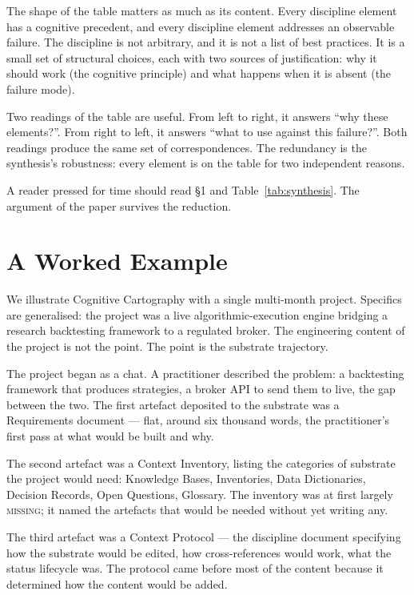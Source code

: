 \documentclass[11pt,a4paper,twocolumn]{article}
\begin{document}
The shape of the table matters as much as its content. Every
discipline element has a cognitive precedent, and every discipline
element addresses an observable failure. The discipline is not
arbitrary, and it is not a list of best practices. It is a small
set of structural choices, each with two sources of justification:
why it should work (the cognitive principle) and what happens when
it is absent (the failure mode).

Two readings of the table are useful. From left to right, it
answers ``why these elements?''. From right to left, it answers
``what to use against this failure?''. Both readings produce the
same set of correspondences. The redundancy is the synthesis's
robustness: every element is on the table for two independent
reasons.

A reader pressed for time should read \S1 and
Table~\ref{tab:synthesis}. The argument of the paper survives the
reduction.

\section{A Worked Example}
\label{sec:example}

We illustrate Cognitive Cartography with a single multi-month
project. Specifics are generalised: the project was a live
algorithmic-execution engine bridging a research backtesting
framework to a regulated broker. The engineering content of the
project is not the point. The point is the substrate trajectory.

The project began as a chat. A practitioner described the
problem: a backtesting framework that produces strategies, a broker
API to send them to live, the gap between the two. The first
artefact deposited to the substrate was a Requirements document ---
flat, around six thousand words, the practitioner's first pass at
what would be built and why.

The second artefact was a Context Inventory, listing the categories
of substrate the project would need: Knowledge Bases, Inventories,
Data Dictionaries, Decision Records, Open Questions, Glossary. The
inventory was at first largely \textsc{missing}; it named the
artefacts that would be needed without yet writing any.

The third artefact was a Context Protocol --- the discipline
document specifying how the substrate would be edited, how
cross-references would work, what the status lifecycle was. The
protocol came before most of the content because it determined how
the content would be added.
\end{document}
